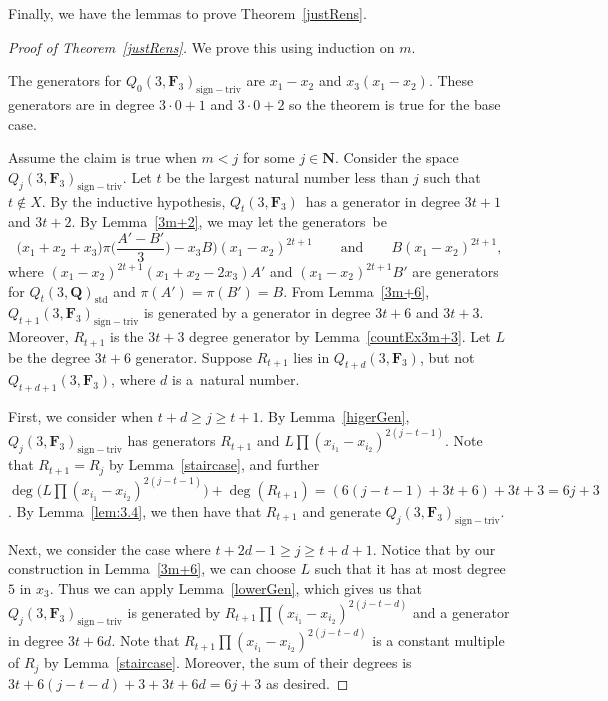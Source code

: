 \documentclass[11pt]{article}
\numberwithin{equation}{section}
\theoremstyle{definition}
\numberwithin{equation}{section}
\newcommand{\std}{\mathrm{std}}
\newcommand{\siv}{\mathrm{sign-triv}}
\begin{document}
Finally, we have the lemmas to prove Theorem~\ref{justRens}.

\begin{proof}[Proof of Theorem~\ref{justRens}]
 We prove this using induction on $m$.

 The generators for $Q_0(3,\mathbf{F}_3)_{\siv}$ are $x_1-x_2$ and $x_3(x_1-x_2)$. These generators are in degree $3\cdot 0 +1$ and $3\cdot 0 +2$ so the theorem is true for the base case.

 Assume the claim is true when $m<j$ for some $j\in \mathbf{N}$. Consider the space $Q_j(3,\mathbf{F}_3)_{\siv}$. Let $t$ be the largest natural number less than $j$ such that $t\not\in X$. By the inductive hypothesis, $Q_t(3,\mathbf{F}_3)$~has a generator in degree $3t+1$ and $3t+2$. By Lemma~\ref{3m+2}, we may let the generators~be
 \[\biggl(x_1+x_2+x_3)\pi\biggl(\frac{A'-B'}{3}\biggr)-x_3B\biggr)(x_1-x_2)^{2t+1}\qquad
 \text{and}\qquad
 B(x_1-x_2)^{2t+1},\]
 where $(x_1-x_2)^{2t+1}(x_1+x_2-2x_3)A'$ and $(x_1-x_2)^{2t+1}B'$ are generators for $Q_t(3,\mathbf{Q})_{\std}$ and $\pi(A')=\pi(B')=B$. From Lemma~\ref{3m+6}, $Q_{t+1}(3,\mathbf{F}_3)_{\siv}$ is generated by a generator in degree ${3t+6}$ and $3t+3$. Moreover, $R_{t+1}$ is the $3t+3$ degree generator by Lemma~\ref{countEx3m+3}. Let $L$ be the degree $3t+6$ generator. Suppose $R_{t+1}$ lies in $Q_{t+d}(3,\mathbf{F}_3)$, but not $Q_{t+d+1}(3,\mathbf{F}_3)$, where $d$ is a~natural number.

 First, we consider when $t+d\geq j\geq t+1$. By Lemma~\ref{higerGen}, $Q_j(3,\mathbf{F}_3)_{\siv}$ has generators $R_{t+1}$ and $L\prod (x_{i_1}-x_{i_2})^{2(j-t-1)}$. Note that $R_{t+1}=R_{j}$ by Lemma~\ref{staircase}, and further $\deg\big(L\prod (x_{i_1}-x_{i_2})^{2(j-t-1)}\big) + \deg(R_{t+1}) = (6(j-t-1) + 3t+6)+3t+3=6j+3$. By Lemma~\ref{lem:3.4}, we then have that $R_{t+1}$ and  generate $Q_j(3,\mathbf{F}_3)_{\siv}$.

 Next, we consider the case where $t+2d-1\geq j\geq t+d+1$. Notice that by our construction in Lemma~\ref{3m+6}, we can choose $L$ such that it has at most degree $5$ in $x_3$. Thus we can apply Lemma~\ref{lowerGen}, which gives us that $Q_j(3,\mathbf{F}_3)_{\siv}$ is generated by $R_{t+1}\prod (x_{i_1}-x_{i_2})^{2(j-t-d)}$ and a generator in degree $3t+6d$. Note that $R_{t+1}\prod (x_{i_1}-x_{i_2})^{2(j-t-d)}$ is a constant multiple of $R_j$ by Lemma~\ref{staircase}. Moreover, the sum of their degrees is $3t+6(j-t-d)+3+3t+6d=6j+3$ as desired.


\end{proof}
\end{document}
